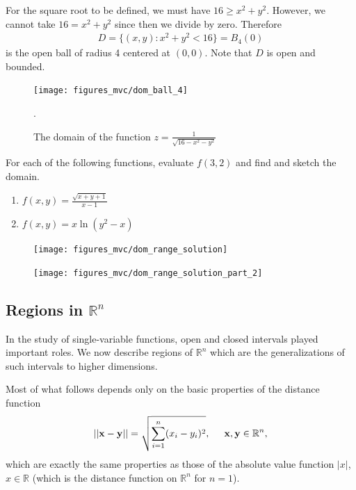 \documentclass[12pt,letterpaper,reqno]{article}
\numberwithin{equation}{section}
\newcommand{\R}{\ensuremath{\mathbb R}}
\newcommand{\bx}{{\bf x}}
\newcommand{\by}{{\bf y}}
\begin{document}
{{\color{red}
\begin{solution}
	For the square root to be defined, we must have $16 \geq x^2+y^2$. However, we cannot take $16=x^2+y^2$ since then we divide by zero. Therefore
	\begin{align*}
		D=\{(x,y):x^2+y^2<16\}=B_4(0)
	\end{align*}
	is the open ball of radius 4 centered at $(0,0)$. Note that $D$ is open and bounded.
	\begin{figure}[h]
		\begin{center}
			\texttt{[image: figures\_mvc/dom\_ball\_4]}
		\end{center}
		\caption{The domain of the function $z=\frac{1}{\sqrt{16-x^2-y^2}}$}.
	\end{figure}
\end{solution}}

\begin{exercise}
For each of the following functions, evaluate $f(3,2)$ and find and sketch the domain.
\begin{enumerate}
	\item $f(x,y)=\frac{\sqrt{x+y+1}}{x-1}$
	\item $f(x,y)=x\ln(y^2-x)$
\end{enumerate} 	
\end{exercise}

\begin{figure}[h]
	\begin{center}
	\texttt{[image: figures\_mvc/dom\_range\_solution]}
\end{center}
\end{figure}

\begin{figure}[h]
	\begin{center}
	\texttt{[image: figures\_mvc/dom\_range\_solution\_part\_2]}
\end{center}
\end{figure}

\subsection{Regions in $\R^n$}
In the study of single-variable functions, open and closed intervals played important roles. We now describe regions of $\R^n$ which are the generalizations of such intervals to higher dimensions.

Most of what follows depends only on the basic properties of the distance function
\begin{align*}
	||\bx-\by||=\sqrt{\sum_{i=1}^n(x_i-y_i)^2}, \hspace{0.5cm} \bx, \by \in \R^n,
\end{align*}
which are exactly the same properties as those of the absolute value function $|x|$, $x \in \R$ (which is the distance function on $\R^n$ for $n=1$).

}
\end{document}
